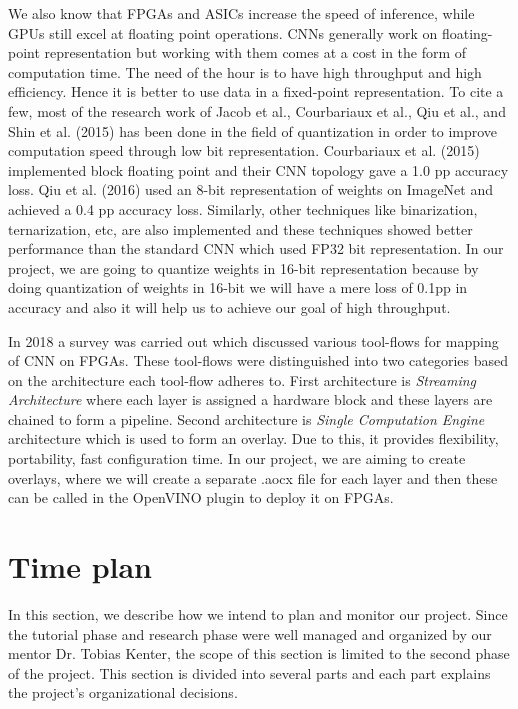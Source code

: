 \documentclass[titlepage]{report}
\begin{document}
We also know that FPGAs and ASICs increase the speed of inference, while GPUs still excel at floating point operations. CNNs generally work on floating-point representation but working with them comes at a cost in the form of computation time. The need of the hour is to have high throughput and high efficiency. Hence it is better to use data in a fixed-point representation. To cite a few, most of the research work of Jacob et al., Courbariaux et al., Qiu et al., and Shin et al. (2015) has been done in the field of quantization in order to improve computation speed through low bit representation. Courbariaux et al. (2015) implemented block floating point and their CNN topology gave a 1.0 pp accuracy loss. Qiu et al. (2016) used an 8-bit representation of weights on ImageNet and achieved a 0.4 pp accuracy loss. Similarly, other techniques like binarization, ternarization, etc, are also implemented and these techniques showed better performance than the standard CNN which used FP32 bit representation. In our project, we are going to quantize weights in 16-bit representation because by doing quantization of weights in 16-bit we will have a mere loss of 0.1pp in accuracy and also it will help us to achieve our goal of high throughput.

In 2018 a survey was carried out which discussed various tool-flows for mapping of CNN on FPGAs. These tool-flows were distinguished into two categories based on the architecture each tool-flow adheres to. First architecture is \textit{Streaming Architecture} where each layer is assigned a hardware block and these layers are chained to form a pipeline. Second architecture is \textit{Single Computation Engine} architecture which is used to form an overlay. Due to this, it provides flexibility, portability, fast configuration time. In our project, we are aiming to create overlays, where we will create a separate .aocx file for each layer and then these can be called in the OpenVINO plugin to deploy it on FPGAs.



\chapter{Time plan}
In this section, we describe how we intend to plan and monitor our project. Since the tutorial phase and research phase were well managed and organized by our mentor Dr. Tobias Kenter, the scope of this section is limited to the second phase of the project. This section is divided into several parts and each part explains the project’s organizational decisions. 
\end{document}
